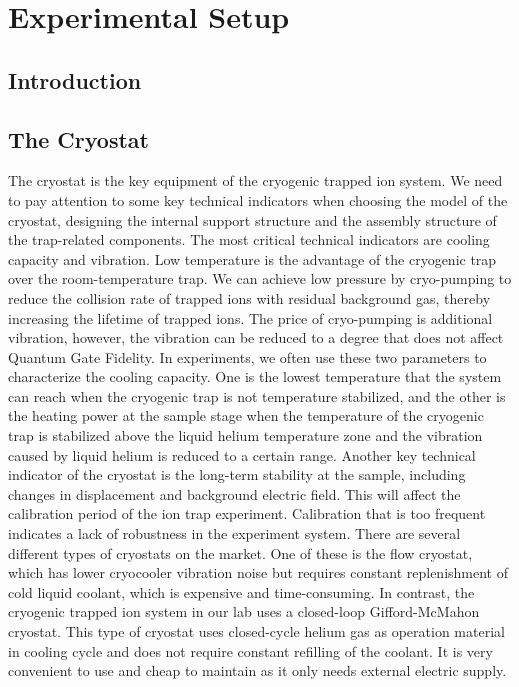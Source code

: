
\chapter{Experimental Setup}

\section{Introduction}



\section{The Cryostat}

The cryostat is the key equipment of the cryogenic trapped ion system. We need to pay attention to some key technical indicators when choosing the model of the cryostat, designing the internal support structure and the assembly structure of the trap-related components. The most critical technical indicators are cooling capacity and vibration. Low temperature is the advantage of the cryogenic trap over the room-temperature trap. We can achieve low pressure by cryo-pumping to reduce the collision rate of trapped ions with residual background gas, thereby increasing the lifetime of trapped ions. The price of cryo-pumping is additional vibration, however, the vibration can be reduced to a degree that does not affect Quantum Gate Fidelity. In experiments, we often use these two parameters to characterize the cooling capacity. One is the lowest temperature that the system can reach when the cryogenic trap is not temperature stabilized, and the other is the heating power at the sample stage when the temperature of the cryogenic trap is stabilized above the liquid helium temperature zone and the vibration caused by liquid helium is reduced to a certain range. Another key technical indicator of the cryostat is the long-term stability at the sample, including changes in displacement and background electric field. This will affect the calibration period of the ion trap experiment. Calibration that is too frequent indicates a lack of robustness in the experiment system.
There are several different types of cryostats on the market. One of these is the flow cryostat, which has lower cryocooler vibration noise but requires constant replenishment of cold liquid coolant, which is expensive and time-consuming. In contrast, the cryogenic trapped ion system in our lab uses a closed-loop Gifford-McMahon cryostat. This type of cryostat uses closed-cycle helium gas as operation material in cooling cycle and does not require constant refilling of the coolant. It is very convenient to use and cheap to maintain as it only needs external electric supply.
